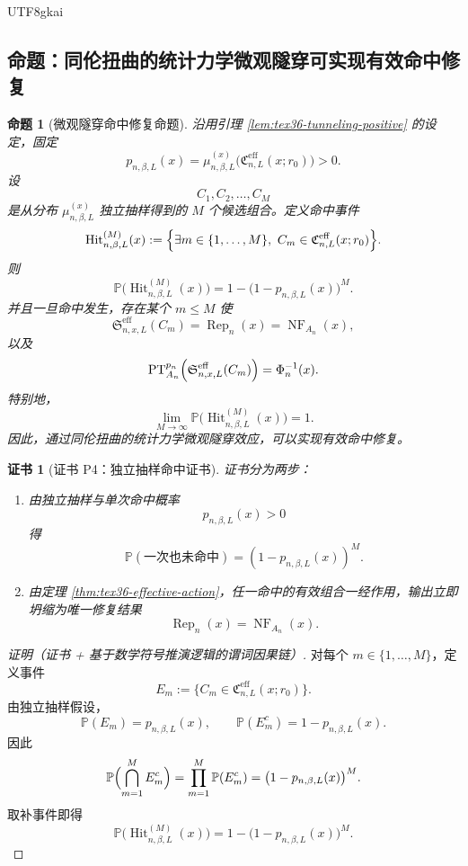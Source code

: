 \documentclass[12pt]{article}
\newtheorem{proposition}{命题}[section]
\newtheorem{Certificate}{证书}[section]
\newcommand{\PT}{\operatorname{PT}}
\newcommand{\NF}{\operatorname{NF}}
\begin{document}
\begin{CJK*}{UTF8}{gkai}
\subsection{命题：同伦扭曲的统计力学微观隧穿可实现有效命中修复}
\label{subsec:tex36-hit-repair}

\begin{proposition}[微观隧穿命中修复命题]
\label{prop:tex36-hit-repair}
沿用引理 \ref{lem:tex36-tunneling-positive} 的设定，固定
\[
  p_{n,\beta,L}(x)
  =
  \mu_{n,\beta,L}^{(x)}\bigl(
    \mathfrak C_{n,L}^{\mathrm{eff}}(x;r_0)
  \bigr)
  >0.
\]
设
\[
  C_1,C_2,\ldots,C_M
\]
是从分布 $\mu_{n,\beta,L}^{(x)}$ 独立抽样得到的 $M$ 个候选组合。定义命中事件
\[
  \operatorname{Hit}_{n,\beta,L}^{(M)}(x)
  :=
  \Bigl\{
    \exists m\in\{1,\ldots,M\},\
    C_m\in \mathfrak C_{n,L}^{\mathrm{eff}}(x;r_0)
  \Bigr\}.
\]
则
\[
  \mathbb P\bigl(
    \operatorname{Hit}_{n,\beta,L}^{(M)}(x)
  \bigr)
  =
  1-\bigl(1-p_{n,\beta,L}(x)\bigr)^M.
\]
并且一旦命中发生，存在某个 $m\le M$ 使
\[
  \mathfrak S_{n,x,L}^{\mathrm{eff}}(C_m)
  =
  \operatorname{Rep}_n(x)
  =
  \NF_{A_n}(x),
\]
以及
\[
  \PT_{A_n}^{p_n}\Bigl(
    \mathfrak S_{n,x,L}^{\mathrm{eff}}(C_m)
  \Bigr)
  =
  \Phi_n^{-1}(x).
\]
特别地，
\[
  \lim_{M\to\infty}
  \mathbb P\bigl(
    \operatorname{Hit}_{n,\beta,L}^{(M)}(x)
  \bigr)
  =1.
\]
因此，通过同伦扭曲的统计力学微观隧穿效应，可以实现有效命中修复。
\end{proposition}

\begin{Certificate}[证书 P4：独立抽样命中证书]
\label{cert:tex36-p4}
证书分为两步：
\begin{enumerate}
  \item 由独立抽样与单次命中概率
  \[
    p_{n,\beta,L}(x)>0
  \]
  得
  \[
    \mathbb P(\text{一次也未命中})=(1-p_{n,\beta,L}(x))^M.
  \]
  \item 由定理 \ref{thm:tex36-effective-action}，任一命中的有效组合一经作用，输出立即坍缩为唯一修复结果
  \[
    \operatorname{Rep}_n(x)=\NF_{A_n}(x).
  \]
\end{enumerate}
\end{Certificate}

\begin{proof}[证明（证书 + 基于数学符号推演逻辑的谓词因果链）]
对每个 $m\in\{1,\ldots,M\}$，定义事件
\[
  E_m
  :=
  \{C_m\in \mathfrak C_{n,L}^{\mathrm{eff}}(x;r_0)\}.
\]
由独立抽样假设，
\[
  \mathbb P(E_m)=p_{n,\beta,L}(x),
\qquad
  \mathbb P(E_m^{c})=1-p_{n,\beta,L}(x).
\]
因此
\[
  \mathbb P\Bigl(\bigcap_{m=1}^{M}E_m^{c}\Bigr)
  =
  \prod_{m=1}^{M}\mathbb P(E_m^{c})
  =
  \bigl(1-p_{n,\beta,L}(x)\bigr)^M.
\]
取补事件即得
\[
  \mathbb P\bigl(
    \operatorname{Hit}_{n,\beta,L}^{(M)}(x)
  \bigr)
  =
  1-\bigl(1-p_{n,\beta,L}(x)\bigr)^M.
\]


\end{proof}
\end{CJK*}
\end{document}
